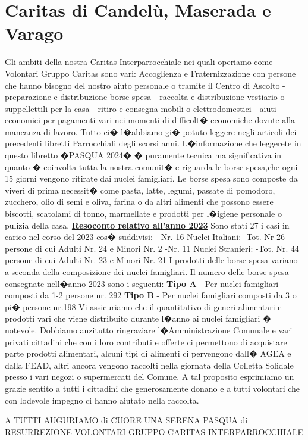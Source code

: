 \section{Caritas di Candelù, Maserada e Varago}
Gli ambiti della nostra Caritas Interparrocchiale nei quali operiamo come Volontari Gruppo Caritas sono vari: Accoglienza e Fraternizzazione con persone che hanno bisogno del nostro aiuto personale o tramite il Centro di Ascolto - preparazione e distribuzione borse spesa - raccolta e distribuzione vestiario o suppellettili per la casa - ritiro e consegna mobili o elettrodomestici - aiuti economici per pagamenti vari nei momenti di difficolt� economiche dovute alla mancanza di lavoro.                         
Tutto ci� l�abbiamo gi� potuto leggere negli articoli dei precedenti libretti Parrocchiali degli scorsi anni.
L�informazione che leggerete in questo libretto �PASQUA 2024� � puramente tecnica ma significativa in quanto � coinvolta  tutta la nostra comunit� e riguarda le borse spesa,che ogni 15 giorni vengono ritirate dai nuclei famigliari.
Le borse spesa sono composte da viveri di prima necessit� come pasta, latte, legumi, passate di pomodoro, zucchero, olio di semi e oliva, farina o da altri alimenti che possono essere biscotti, scatolami di tonno, marmellate e prodotti per l�igiene personale o pulizia della casa.
\textbf{\underline{Resoconto relativo all’anno  2023}}
Sono stati 27 i casi in carico nel corso del 2023 cos� suddivisi:
- Nr. 16 Nuclei Italiani:
-Tot. Nr  26 persone di cui Adulti Nr. 24  e Minori Nr. 2
-Nr. 11 Nuclei Stranieri:
-Tot. Nr. 44 persone di cui Adulti Nr. 23 e  Minori Nr. 21
I prodotti delle borse spesa variano a seconda della composizione dei nuclei famigliari.
Il numero delle borse spesa consegnate nell�anno 2023 sono i seguenti:
\textbf{Tipo A} - Per nuclei famigliari composti da 1-2 persone nr. 292
\textbf{Tipo B} - Per nuclei famigliari composti da 3 o pi� persone nr.198
Vi assicuriamo che il quantitativo di generi alimentari e prodotti vari che viene distribuito durante l�anno ai nuclei famigliari � notevole.
Dobbiamo anzitutto ringraziare l�Amministrazione Comunale e vari privati cittadini che con i loro contributi e offerte ci permettono di acquistare parte prodotti alimentari, alcuni tipi di alimenti ci pervengono dall� AGEA e dalla FEAD, altri ancora vengono raccolti nella giornata della Colletta Solidale presso i vari negozi o supermercati del Comune. A tal proposito esprimiamo un grazie sentito a tutti i cittadini che generosamente donano   e a tutti volontari che con lodevole impegno ci hanno aiutato nella raccolta.

A TUTTI AUGURIAMO di CUORE UNA SERENA PASQUA di RESURREZIONE
VOLONTARI GRUPPO CARITAS INTERPARROCCHIALE

